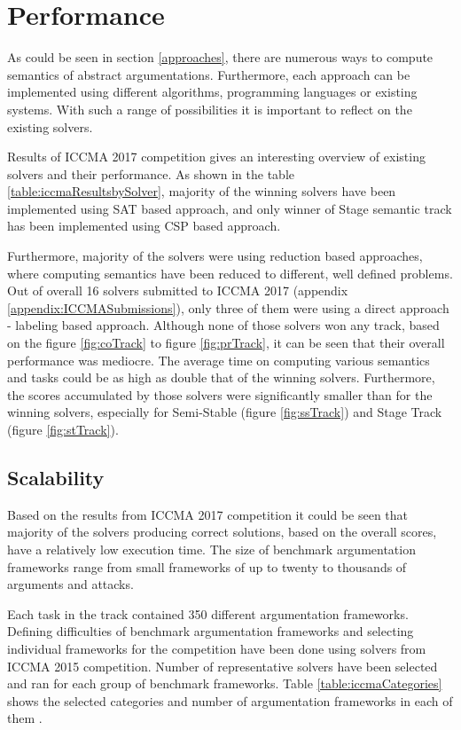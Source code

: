 \section{Performance}
As could be seen in section \ref{approaches}, there are numerous ways to compute semantics of abstract argumentations. Furthermore, each approach can be implemented using different algorithms, programming languages or existing systems. With such a range of possibilities it is important to reflect on the existing solvers.

Results of ICCMA 2017 competition \citep{iccmaResults} gives an interesting overview of existing solvers and their performance. As shown in the table \ref{table:iccmaResultsbySolver}, majority of the winning solvers have been implemented using SAT based approach, and only winner of Stage semantic track has been implemented using CSP based approach. 

Furthermore, majority of the solvers were using reduction based approaches, where computing semantics have been reduced to different, well defined problems. Out of overall 16 solvers submitted to ICCMA 2017 (appendix \ref{appendix:ICCMASubmissions}), only three of them were using a direct approach - labeling based approach. Although none of those solvers won any track, based on the figure \ref{fig:coTrack} to figure \ref{fig:prTrack}, it can be seen that their overall performance was mediocre. The average time on computing various semantics and tasks could be as high as double that of the winning solvers. Furthermore, the scores accumulated by those solvers were significantly smaller than for the winning solvers, especially for Semi-Stable (figure \ref{fig:ssTrack}) and Stage Track (figure \ref{fig:stTrack}).


\subsection{Scalability}
Based on the results from ICCMA 2017 competition it could be seen that majority of the solvers producing correct solutions, based on the overall scores, have a relatively low execution time. The size of benchmark argumentation frameworks range from small frameworks of up to twenty to thousands of arguments and attacks.

Each task in the track contained 350 different argumentation frameworks. Defining difficulties of benchmark argumentation frameworks and selecting individual frameworks for the competition have been done using solvers from ICCMA 2015 competition. Number of representative solvers have been selected and ran for each group of benchmark frameworks. Table \ref{table:iccmaCategories} shows the selected categories and number of argumentation frameworks in each of them \citep{results_sildes}.

